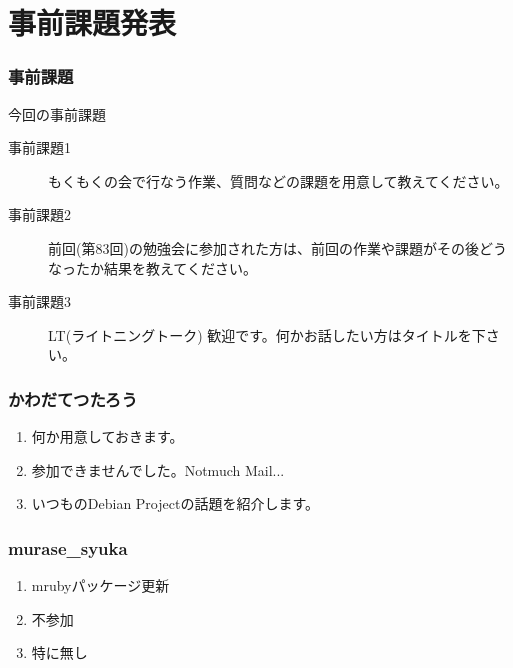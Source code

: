 \documentclass[cjk,dvipdfmx,10pt,compress,%
hyperref={bookmarks=true,bookmarksnumbered=true,bookmarksopen=false,%
colorlinks=false,%
pdftitle={第 84 回 関西 Debian 勉強会},%
pdfauthor={倉敷・のがた・佐々木・かわだ・八津尾},%
pdfsubject={資料},%
}]{beamer}
\begin{document}

\section{事前課題発表}


\begin{frame}[fragile]
  \frametitle{事前課題}
  \begin{block}{今回の事前課題}
    \begin{description}
    \item[事前課題1]
      もくもくの会で行なう作業、質問などの課題を用意して教えてください。
    \item[事前課題2]
      前回(第83回)の勉強会に参加された方は、前回の作業や課題がその後どう
      なったか結果を教えてください。
    \item[事前課題3]
      LT(ライトニングトーク) 歓迎です。何かお話したい方はタイトルを下さい。
    \end{description}
  \end{block}
\end{frame}


\begin{frame}
  \frametitle{ かわだてつたろう }
  \begin{enumerate}
  \item 何か用意しておきます。
  \item 参加できませんでした。Notmuch Mail...
  \item いつものDebian Projectの話題を紹介します。
  \end{enumerate}
\end{frame}

\begin{frame}
  \frametitle{ murase\_{}syuka }
  \begin{enumerate}
  \item mrubyパッケージ更新
  \item 不参加
  \item 特に無し
  \end{enumerate}
\end{frame}
\end{document}
